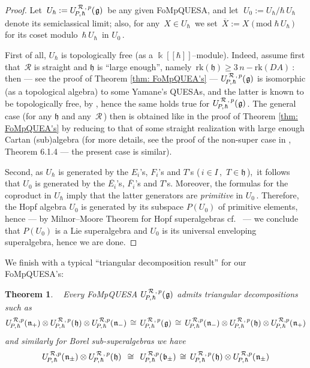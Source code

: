 \documentclass[12pt,reqno,twoside,a4paper]{amsart}
\numberwithin{equation}{section}
\newtheorem{theorem}[lema]{Theorem}
\theoremstyle{definition}
\newtheorem{free text}[lema]{}
\theoremstyle{remark}
\newcommand{\R}{{\mathcal R}}
\def \kh{{\Bbbk[[\hbar]]}}
\def \lieg{\mathfrak{g}}
\def \lieb{\mathfrak{b}}
\def \lieh{\mathfrak{h}}
\def \lien{\mathfrak{n}}
\def \uRpPhg{U^{\,\R\,,\,p}_{\!P,\hskip0,7pt\hbar}(\hskip0,5pt\lieg)}
\def \uRpPhh{U^{\,\R\,,\,p}_{\!P,\hskip0,7pt\hbar}(\hskip0,5pt\lieh)}
\def \uRpPhbpm{U^{\,\R,p}_{\!P,\hskip0,7pt\hbar}(\hskip0,5pt\lieb_\pm)}
\def \uRpPhnp{U^{\,\R,p}_{\!P,\hskip0,7pt\hbar}(\hskip0,5pt\lien_+)}
\def \uRpPhnm{U^{\,\R,p}_{\!P,\hskip0,7pt\hbar}(\hskip0,5pt\lien_-)}
\def \uRpPhnpm{U^{\,\R,p}_{\!P,\hskip0,7pt\hbar}(\hskip0,5pt\lien_\pm)}
\theoremstyle{plain}
\begin{document}
\begin{proof}
%
 Let  $ \, U_\hbar := \uRpPhg \, $  be any given FoMpQUESA, and let  $ \; U_0 := U_\hbar \Big/ \hbar\,U_\hbar \; $  denote its semiclassical limit; also, for any  $ \, X  \in U_\hbar \, $  we set  $ \, \overline{X} := X \; \big(\,\text{mod} \; \hbar\,U_\hbar \,\big) \, $  for its coset modulo  $ \, \hbar\,U_\hbar \, $  in  $ U_0 \, $.
                                                        \par
   First of all,  $ U_\hbar $  is topologically free (as a  $ \kh $--module).  Indeed, assume first that  $ \,\R $  is straight and  $ \lieh $  is ``large enough'', namely  $ \, \text{rk}(\lieh) \geq 3\,n - \text{rk}(DA) \ $:  \,then   --- see the proof of  Theorem \ref{thm: FoMpQUEA's}  ---   $ \uRpPhg $  is isomorphic (as a topological algebra) to some Yamane's QUESAs, and the latter is known to be topologically free, by  \cite{Ya1},  hence the same holds true for  $ \uRpPhg \, $.  The general case (for any  $ \lieh $  and any  $ \,\R \, $)  then is obtained like in the proof of  Theorem \ref{thm: FoMpQUEA's}  by reducing to that of some straight realization with large enough Cartan (sub)algebra (for more details, see the proof of the non-super case in  \cite{GG3}, Theorem 6.1.4   ---   the present case is similar).
                                                                    \par
   Second, as  $ U_\hbar $  is generated by the  $ E_i $'s,  $ F_i $'s  and  $ T $'s  ($ \, i \in I \, $,  $ \, T \in \lieh \, $),  \,it follows that  $ U_0 $  is generated by the  $ \overline{E_i} $'s,  $ \overline{F_i} $'s  and  $ T $'s.  Moreover, the formulas for the coproduct in  $ U_\hbar $  imply that the latter generators are  \textit{primitive\/}  in  $ U_0 \, $.  Therefore, the Hopf algebra  $ U_0 $  is generated by its subspace  $ P(U_0) $  of primitive elements, hence   --- by Milnor--Moore Theorem for Hopf superalgebras  cf.~\cite[Proposition 3.2]{Ko}  ---   we conclude that  $ P(U_0) $  is a Lie superalgebra and  $ U_0 $  is its universal enveloping superalgebra, hence we are done.
%
\end{proof}

\vskip9pt

   We finish with a typical ``triangular decomposition result'' for our FoMpQUESA's:

\vskip15pt

\begin{theorem}  \label{thm: triang-decomp}  {\ }
%
 \vskip3pt
%
   Every FoMpQUESA  $ \uRpPhg $  admits  \textsl{triangular decompositions}  such as
%
  $$  \uRpPhnp \otimes \uRpPhh \otimes \uRpPhnm  \, \cong \,  \uRpPhg  \, \cong \,  \uRpPhnm \otimes \uRpPhh \otimes \uRpPhnp  $$
%
 and similarly for Borel sub-superalgebras we have
%
  $$  \uRpPhnpm \otimes \uRpPhh  \,\; \cong \;\,  \uRpPhbpm  \, \cong \,  \uRpPhh \otimes \uRpPhnpm  $$
%
\end{theorem}
\end{document}

